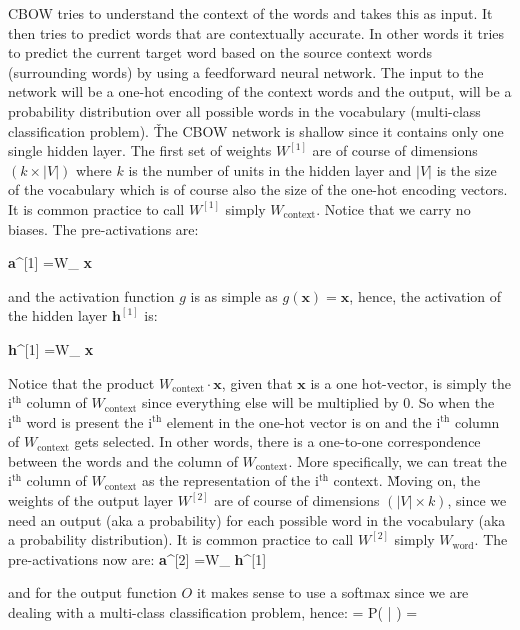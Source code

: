 CBOW tries to understand the context of the words and takes this as input. It then tries to predict words that are
contextually accurate. In other words it tries to predict the current target word based on the source context words
(surrounding words) by using a feedforward neural network. The input to the network will be a one-hot encoding of the
context words and the output, will be a probability distribution over all possible words in the vocabulary (multi-class
classification problem). \v

The CBOW network is shallow since it contains only one single hidden layer. The first set of weights $W^{[1]}$ are of
course of dimensions $(k \times |V|)$ where $k$ is the number of units in the hidden layer and $|V|$ is the size of
the vocabulary which is of course also the size of the one-hot encoding vectors. It is common practice to call $W^{[1]}$
simply $W_{\text{context}}$. Notice that we carry no biases. The pre-activations are:

\bse
\textbf{a}^{[1]} =W_{} \cdot \textbf{x}
\ese

and the activation function $g$ is as simple as $g(\textbf{x}) = \textbf{x}$, hence, the activation of the hidden
layer $\textbf{h}^{[1]}$ is:

\bse
\textbf{h}^{[1]} =W_{} \cdot \textbf{x}
\ese

Notice that the product $W_{\text{context}} \cdot \textbf{x}$, given that $\textbf{x}$ is a one hot-vector, is
simply the $\text{i}^{\text{th}}$ column of $W_{\text{context}}$ since everything else will be multiplied by 0.
So when the $\text{i}^{\text{th}}$ word is present the $\text{i}^{\text{th}}$ element in the one-hot vector
is on and the $\text{i}^{\text{th}}$ column of $W_{\text{context}}$ gets selected. In other words, there is a
one-to-one correspondence between the words and the column of $W_{\text{context}}$. More specifically, we can treat
the $\text{i}^{\text{th}}$ column of $W_{\text{context}}$ as the representation of the
$\text{i}^{\text{th}}$ context. \v

Moving on, the weights of the output layer $W^{[2]}$ are of course of dimensions $(|V| \times k)$, since we need an
output (aka a probability) for each possible word in the vocabulary (aka a probability distribution). It is common
practice to call $W^{[2]}$ simply $W_{\text{word}}$. The pre-activations now are:
\bse
\textbf{a}^{[2]} =W_{} \cdot \textbf{h}^{[1]}
\ese

and for the output function $O$ it makes sense to use a softmax since we are dealing with a multi-class
classification problem, hence:
\bse
{} = P( | ) = 
\ese

